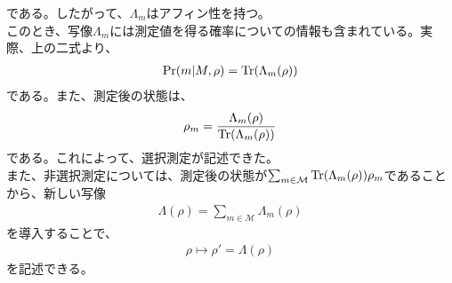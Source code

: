 \documentclass[a4paper,11pt]{jsarticle}
\numberwithin{equation}{section}
\begin{document}
である。したがって、$\Lambda_m$はアフィン性を持つ。\\
このとき、写像$\Lambda_m$には測定値を得る確率についての情報も含まれている。実際、上の二式より、
\begin{align}
    \Pr(m|M,\rho) = \Tr(\Lambda_m(\rho))
\end{align}
である。また、測定後の状態は、
\begin{align}
    \rho_m = \frac{\Lambda_m(\rho)}{\Tr(\Lambda_m(\rho))}
\end{align}
である。これによって、選択測定が記述できた。\\
また、非選択測定については、測定後の状態が$\sum_{m \in \mathcal{M}} \Tr(\Lambda_m(\rho))\rho_m$であることから、新しい写像
\begin{align}
    \Lambda(\rho) = \sum_{m \in \mathcal{M}} \Lambda_m(\rho)
\end{align}
を導入することで、
\begin{align}
    \rho \mapsto \rho' = \Lambda(\rho)
\end{align}
を記述できる。
\end{document}
